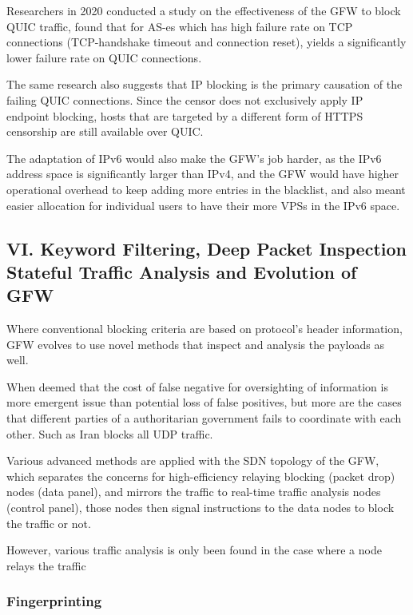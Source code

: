 Researchers in 2020 conducted a study on the effectiveness of the GFW to
block QUIC traffic, found that for AS-es which has high failure rate on
TCP connections (TCP-handshake timeout and connection reset), yields a
significantly lower failure rate on QUIC connections.
\cite{53_quicBlock}

The same research also suggests that IP blocking is the primary
causation of the failing QUIC connections. Since the censor does not
exclusively apply IP endpoint blocking, hosts that are targeted by a
different form of HTTPS censorship are still available over QUIC.

The adaptation of IPv6 would also make the GFW's job harder, as the IPv6
address space is significantly larger than IPv4, and the GFW would have
higher operational overhead to keep adding more entries in the
blacklist, and also meant easier allocation for individual users to have
their more VPSs in the IPv6 space.

\hypertarget{vi.-keyword-filtering-deep-packet-inspection-stateful-traffic-analysis-and-evolution-of-gfw}{%
\subsection{VI. Keyword Filtering, Deep Packet Inspection Stateful
Traffic Analysis and Evolution of
GFW}\label{vi.-keyword-filtering-deep-packet-inspection-stateful-traffic-analysis-and-evolution-of-gfw}}

Where conventional blocking criteria are based on protocol's header
information, GFW evolves to use novel methods that inspect and analysis
the payloads as well.

When deemed that the cost of false negative for oversighting of
information is more emergent issue than potential loss of false
positives, but more are the cases that different parties of a
authoritarian government fails to coordinate with each other. Such as
Iran blocks all UDP traffic. \cite{53_quicBlock}

Various advanced methods are applied with the SDN topology of the GFW,
which separates the concerns for high-efficiency relaying blocking
(packet drop) nodes (data panel), and mirrors the traffic to real-time
traffic analysis nodes (control panel), those nodes then signal
instructions to the data nodes to block the traffic or not.

However, various traffic analysis is only been found in the case where a
node relays the traffic

\hypertarget{fingerprinting}{%
\subsubsection{Fingerprinting}\label{fingerprinting}}

